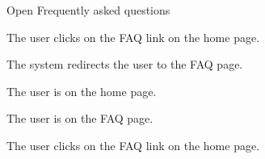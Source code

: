 
\begin{uc}{Open Frequently asked questions}

    \begin{uc-mss}
    \item The user clicks on the FAQ link on the home page.
    \item The system redirects the user to the FAQ page.
    \end{uc-mss}

    \begin{uc-pre}
    \item The user is on the home page.
    \end{uc-pre}

    \begin{uc-post}
    \item The user is on the FAQ page.
    \end{uc-post}

    \begin{uc-trig}
        The user clicks on the FAQ link on the home page.
    \end{uc-trig}

\end{uc}

